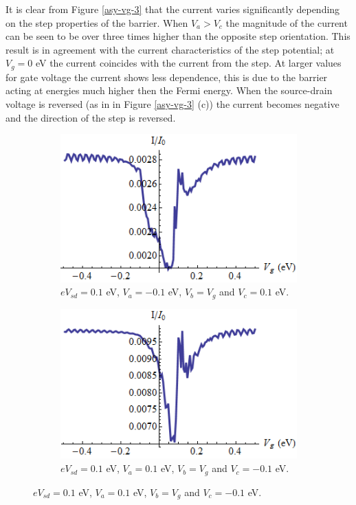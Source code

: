 		It is clear from Figure \ref{asy-vg-3} that the current varies significantly depending on the step properties of the barrier. When $V_{a}>V_{c}$ the magnitude of the current can be seen to be over three times higher than the opposite step orientation. This result is in agreement with the current characteristics of the step potential; at $V_{g}=0$ eV the current coincides with the current from the step. At larger values for gate voltage the current shows less dependence, this is due to the barrier acting at energies much higher then the Fermi energy. When the source-drain voltage is reversed (as in  in Figure \ref{asy-vg-3} (c)) the current becomes negative and the direction of the step is reversed.
		\begin{figure}[h]
			 \begin{subfigure}[h]{0.3\textwidth}
				\centerline{\includegraphics[scale=0.35]{images/asy-vg-3}}
				\caption{$eV_{sd}=0.1$ eV, $V_{a}=-0.1$ eV, $V_{b}=V_{g}$ and $V_{c}=0.1$ eV.}
			\end{subfigure}
			\hspace{0.5cm}
			\begin{subfigure}[h]{0.3\textwidth}
				\centerline{\includegraphics[scale=0.35]{images/asy-vg-4}}
				\caption{$eV_{sd}=0.1$ eV, $V_{a}=0.1$ eV, $V_{b}=V_{g}$ and $V_{c}=-0.1$ eV.}
			\end{subfigure}

\end{figure}
